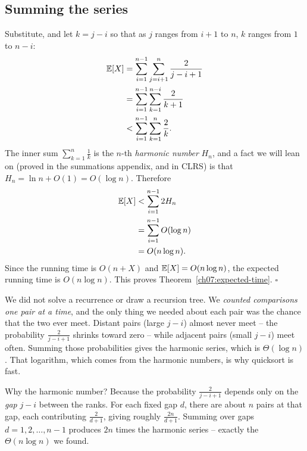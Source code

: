 \subsection{Summing the series}

Substitute, and let $k = j - i$ so that as $j$ ranges from $i+1$ to $n$, $k$
ranges from $1$ to $n - i$:
\begin{align*}
\mathbb{E}[X] &= \sum_{i=1}^{n-1}\sum_{j=i+1}^{n} \frac{2}{j-i+1} \\
      &= \sum_{i=1}^{n-1}\sum_{k=1}^{n-i} \frac{2}{k+1} \\
      &< \sum_{i=1}^{n-1}\sum_{k=1}^{n} \frac{2}{k}.
\end{align*}
The inner sum $\sum_{k=1}^{n} \frac{1}{k}$ is the $n$-th \emph{harmonic number}
$H_n$, and a fact we will lean on (proved in the summations appendix, and in
CLRS) is that $H_n = \ln n + O(1) = O(\log n)$. Therefore
\begin{align*}
\mathbb{E}[X] &< \sum_{i=1}^{n-1} 2 H_n \\
      &= \sum_{i=1}^{n-1} O(\log n) \\
      &= O(n \log n).
\end{align*}
Since the running time is $O(n + X)$ and $\mathbb{E}[X] = O(n \log n)$, the expected
running time is $O(n \log n)$. This proves Theorem~\ref{ch07:expected-time}.
\hfill$\square$

\begin{intuitionbox}
We did not solve a recurrence or draw a recursion tree. We \emph{counted comparisons one pair at a time}, and
the only thing we needed about each pair was the chance that the two ever
meet. Distant pairs (large $j - i$) almost never meet -- the probability
$\frac{2}{j-i+1}$ shrinks toward zero -- while adjacent pairs (small $j-i$) meet
often. Summing those probabilities gives the harmonic series, which is
$\Theta(\log n)$. That logarithm, which comes from the harmonic numbers, is
why quicksort is fast.
\end{intuitionbox}

\begin{remark}
Why the harmonic number? Because the probability $\frac{2}{j-i+1}$ depends only
on the \emph{gap} $j - i$ between the ranks. For each fixed gap $d$, there are
about $n$ pairs at that gap, each contributing $\frac{2}{d+1}$, giving roughly
$\frac{2n}{d+1}$. Summing over gaps $d = 1, 2, \dots, n-1$ produces $2n$ times
the harmonic series -- exactly the $\Theta(n \log n)$ we found.
\end{remark}

